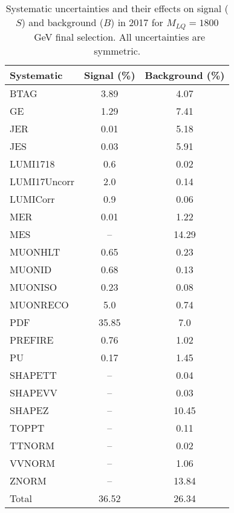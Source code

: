 \begin{table}[htbp]
\begin{center}
\caption{Systematic uncertainties and their effects on signal ($S$) and background ($B$) in 2017 for $M_{LQ}=1800$~GeV final selection. All uncertainties are symmetric.}
\begin{tabular}{lcc}
\hline\hline
Systematic & Signal (\%) & Background (\%) \\ \hline 
BTAG & 3.89 & 4.07\\ 
GE & 1.29 & 7.41\\ 
JER & 0.01 & 5.18\\ 
JES & 0.03 & 5.91\\ 
LUMI1718 & 0.6 & 0.02\\ 
LUMI17Uncorr & 2.0 & 0.14\\ 
LUMICorr & 0.9 & 0.06\\ 
MER & 0.01 & 1.22\\ 
MES & -- & 14.29\\ 
MUONHLT & 0.65 & 0.23\\ 
MUONID & 0.68 & 0.13\\ 
MUONISO & 0.23 & 0.08\\ 
MUONRECO & 5.0 & 0.74\\ 
PDF & 35.85 & 7.0\\ 
PREFIRE & 0.76 & 1.02\\ 
PU & 0.17 & 1.45\\ 
SHAPETT & -- & 0.04\\ 
SHAPEVV & -- & 0.03\\ 
SHAPEZ & -- & 10.45\\ 
TOPPT & -- & 0.11\\ 
TTNORM & -- & 0.02\\ 
VVNORM & -- & 1.06\\ 
ZNORM & -- & 13.84\\ 
Total & 36.52 & 26.34\\ \hline \hline
\end{tabular}
\label{tab:SysUncertainties_uujj_1800}
\end{center}
\end{table}

